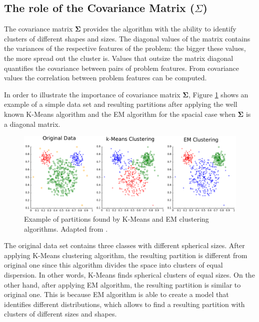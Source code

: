 \subsection{The role of the Covariance Matrix ($\Sigma$)}

The covariance matrix $\bm{\Sigma}$ provides the algorithm with the ability to identify clusters of different shapes and sizes. The diagonal values of the matrix contains the variances of the respective features of the problem: the bigger these values, the more spread out the cluster is. Values that outsize the matrix diagonal quantifies the covariance between pairs of problem features. From covariance values the correlation between problem features can be computed.

In order to illustrate the importance of covariance matrix $\bm{\Sigma}$, Figure \ref{example_partition} shows an example of a simple data set and resulting partitions after applying the well known K-Means algorithm and the EM algorithm for the spacial case when $\bm{\Sigma}$ is a diagonal matrix. 

\begin{figure}[ht]
\centering
\includegraphics[width=13cm]{"Part 3 - Learning Systems/Unsupervised Learning/Expectation-Maximization/figures/ClusterAnalysis_Mouse.png"}
\caption{Example of partitions found by K-Means and EM clustering algorithms. Adapted from \cite{Chire}.}
\label{example_partition}
\end{figure}

The original data set contains three classes with different spherical sizes. After applying K-Means clustering algorithm, the resulting partition is different from original one since this algorithm divides the space into clusters of equal dispersion. In other words, K-Means finds spherical clusters of equal sizes. On the other hand, after applying EM algorithm, the resulting partition is similar to original one. This is because EM algorithm is able to create a model that identifies different distributions, which allows to find a resulting partition with clusters of different sizes and shapes.


